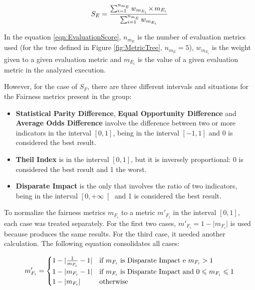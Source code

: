 \documentclass[sigconf]{acmart}
\let\oldtimes\times
\def\times{{\mkern1mu\oldtimes\mkern1mu}}
\begin{document}
\begin{equation}
\label{eqn:EvaluationScore}
	\begin{aligned}
	S_{E} = \frac{\sum_{i=1}^{n_{m_E}} w_{m_{E_i}} \times m_{E_{i}}}{\sum_{i=1}^{n_{m_E}} w_{m_{E_i}}}
	\end{aligned}
\end{equation}

In the equation \ref{eqn:EvaluationScore}, $n_{m_E}$ is the number of evaluation metrics used (for the tree defined in Figure \ref{fig:MetricTree}, $n_{m_E} = 5$), $w_{m_{E_i}}$ is the weight given to a given evaluation metric and $m_{E_{i}}$ is the value of a given evaluation metric in the analyzed execution.

However, for the case of $S_F$, there are three different intervals and situations for the Fairness metrics present in the group:

\begin{itemize}
	\item \textbf{Statistical Parity Difference}, \textbf{Equal Opportunity Difference} and \textbf{Average Odds Difference} involve the difference between two or more indicators in the interval $\left[0,1 \right]$, being in the interval $\left[-1,1 \right]$ and 0 is considered the best result.
	\item \textbf{Theil Index} is in the interval $\left[0,1 \right]$, but it is inversely proportional: 0 is considered the best result and 1 the worst.
	\item \textbf{Disparate Impact} is the only that involves the ratio of two indicators, being in the interval $\left[0,+\infty \right[$ and 1 is considered the best result.
\end{itemize}

To normalize the fairness metrics $m_{F_i}$ to a metric $m'_{F_i}$ in the interval $\left[0,1 \right]$, each case was treated separately. For the first two cases, $m'_{F_i} = 1-\lvert m_{F_i} \rvert$ is used because produces the same results. For the third case, it needed another calculation. The following equation consolidates all cases:

\begin{equation}
\label{eqn:normalizationFairnessStep3}
	\begin{aligned}
	m'_{F_i} = 
	\begin{cases}
	1-\lvert \frac{1}{m_{F_i}}-1 \lvert & \text{if $m_{F_i}$ is Disparate Impact e $m_{F_i} > 1$}\\
	1-\lvert m_{F_i}-1 \lvert & \resizebox{0.56\hsize}{!}{\text{if $m_{F_i}$ is Disparate Impact and $0 \leqslant m_{F_i} \leqslant 1$}}\\
	1-\lvert m_{F_i} \rvert & \text{otherwise}
	\end{cases}
	\end{aligned}
\end{equation}
\end{document}
